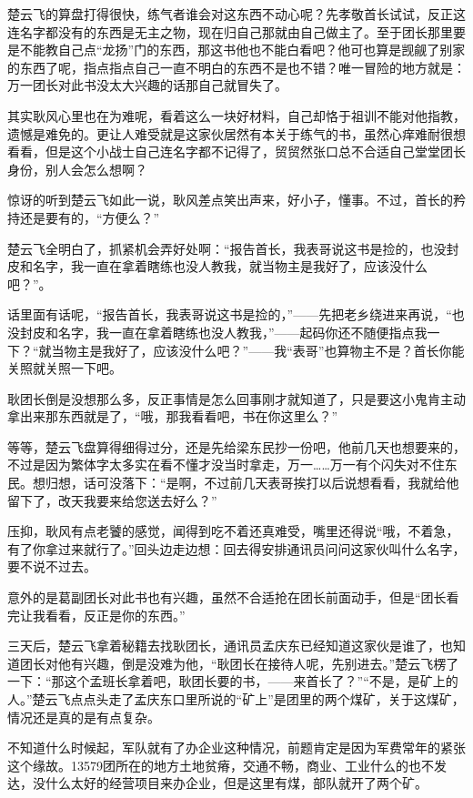 楚云飞的算盘打得很快，练气者谁会对这东西不动心呢？先孝敬首长试试，反正这连名字都没有的东西是无主之物，现在归自己那就由自己做主了。至于团长那里要是不能教自己点“龙扬”门的东西，那这书他也不能白看吧？他可也算是觊觎了别家的东西了呢，指点指点自己一直不明白的东西不是也不错？唯一冒险的地方就是：万一团长对此书没太大兴趣的话那自己就冒失了。

其实耿风心里也在为难呢，看着这么一块好材料，自己却恪于祖训不能对他指教，遗憾是难免的。更让人难受就是这家伙居然有本关于练气的书，虽然心痒难耐很想看看，但是这个小战士自己连名字都不记得了，贸贸然张口总不合适自己堂堂团长身份，别人会怎么想啊？

惊讶的听到楚云飞如此一说，耿风差点笑出声来，好小子，懂事。不过，首长的矜持还是要有的，“方便么？”

楚云飞全明白了，抓紧机会弄好处啊：“报告首长，我表哥说这书是捡的，也没封皮和名字，我一直在拿着瞎练也没人教我，就当物主是我好了，应该没什么吧？”。

话里面有话呢，“报告首长，我表哥说这书是捡的，”——先把老乡绕进来再说，“也没封皮和名字，我一直在拿着瞎练也没人教我，”——起码你还不随便指点我一下？“就当物主是我好了，应该没什么吧？”——我“表哥”也算物主不是？首长你能关照就关照一下吧。

耿团长倒是没想那么多，反正事情是怎么回事刚才就知道了，只是要这小鬼肯主动拿出来那东西就是了，“哦，那我看看吧，书在你这里么？”

等等，楚云飞盘算得细得过分，还是先给梁东民抄一份吧，他前几天也想要来的，不过是因为繁体字太多实在看不懂才没当时拿走，万一……万一有个闪失对不住东民。想归想，话可没落下：“是啊，不过前几天表哥挨打以后说想看看，我就给他留下了，改天我要来给您送去好么？”

压抑，耿风有点老饕的感觉，闻得到吃不着还真难受，嘴里还得说“哦，不着急，有了你拿过来就行了。”回头边走边想：回去得安排通讯员问问这家伙叫什么名字，要不说不过去。

意外的是葛副团长对此书也有兴趣，虽然不合适抢在团长前面动手，但是“团长看完让我看看，反正是你的东西。”

三天后，楚云飞拿着秘籍去找耿团长，通讯员孟庆东已经知道这家伙是谁了，也知道团长对他有兴趣，倒是没难为他，“耿团长在接待人呢，先别进去。”楚云飞楞了一下：“那这个孟班长拿着吧，耿团长要的书，——来首长了？”“不是，是矿上的人。”楚云飞点点头走了孟庆东口里所说的“矿上”是团里的两个煤矿，关于这煤矿，情况还是真的是有点复杂。

不知道什么时候起，军队就有了办企业这种情况，前题肯定是因为军费常年的紧张这个缘故。13579团所在的地方土地贫瘠，交通不畅，商业、工业什么的也不发达，没什么太好的经营项目来办企业，但是这里有煤，部队就开了两个矿。


